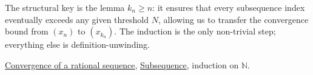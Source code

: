 \begin{remark*}
The structural key is the lemma $k_n \geq n$: it ensures that every
subsequence index eventually exceeds any given threshold $N$, allowing
us to transfer the convergence bound from $(x_n)$ to $(x_{k_n})$.
The induction is the only non-trivial step; everything else is definition-unwinding.
\end{remark*}

\begin{dependencies}
\hyperref[def:convergent-rational-sequence]{Convergence of a rational sequence},
\hyperref[def:subsequence-q]{Subsequence},
induction on $\mathbb{N}$.
\end{dependencies}

\clearpage
